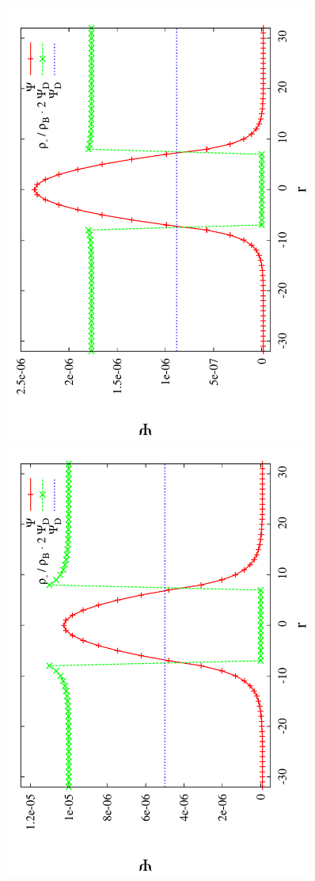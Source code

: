 \begin{figure}[htpb]
\includegraphics[angle=-90,width=0.9\textwidth]{./pics/test_dh1.pdf}\\
\includegraphics[angle=-90,width=0.9\textwidth]{./pics/test_dh2.pdf}

\end{figure}
